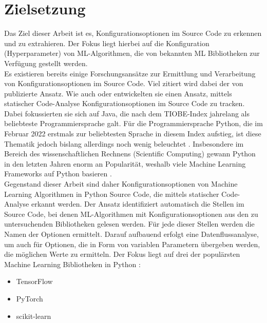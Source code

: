 \documentclass[german,bachelor]{swsLeipzig}
\begin{document}
\section{Zielsetzung}
Das Ziel dieser Arbeit ist es, Konfigurationsoptionen im Source Code zu erkennen und zu extrahieren.
Der Fokus liegt hierbei auf die Konfiguration (Hyperparameter) von ML-Algorithmen, die von bekannten ML Bibliotheken
zur Verfügung gestellt werden.\\
\indent Es existieren bereits einige Forschungsansätze zur Ermittlung und Verarbeitung von Konfigurationsoptionen im Source Code.
Viel zitiert wird dabei der von \citeauthor{10.1145/1985793.1985812} \citeyear{10.1145/1985793.1985812} publizierte Ansatz.
Wie auch \citeauthor{7774519} oder \citeauthor{8049300} entwickelten sie einen Ansatz, mittels statischer Code-Analyse Konfigurationsoptionen
im Source Code zu tracken.
Dabei fokussierten sie sich auf Java, die nach dem TIOBE-Index jahrelang als beliebteste Programmiersprache galt.
Für die Programmiersprache Python, die im Februar 2022 erstmals zur beliebtesten Sprache in diesem Index aufstieg,
ist diese Thematik jedoch bislang allerdings noch wenig beleuchtet \cite[]{enwiki:1077809155}.
Insbesondere im Bereich des wissenschaftlichen Rechnens (Scientific Computing) gewann Python in den letzten Jahren enorm an Popularität,
weshalb viele Machine Learning Frameworks auf Python basieren \cite[]{2020}.\\
\indent Gegenstand dieser Arbeit sind daher Konfigurationsoptionen von Machine Learning Algorithmen in Python Source Code,
die mittels statischer Code-Analyse erkannt werden.
Der Ansatz identifiziert automatisch die Stellen im Source Code, bei denen ML-Algorithmen mit Konfigurationsoptionen aus
den zu untersuchenden Bibliotheken gelesen werden.
Für jede dieser Stellen werden die Namen der Optionen ermittelt.
Darauf aufbauend erfolgt eine Datenflussanalyse, um auch für Optionen, die in Form von variablen Parametern übergeben werden,
die möglichen Werte zu ermitteln.
Der Fokus liegt auf drei der populärsten Machine Learning Bibliotheken in Python \cite[]{kaggle}:
\begin{itemize}
 \item TensorFlow
 \item PyTorch
 \item scikit-learn
\end{itemize}
\
\end{document}
